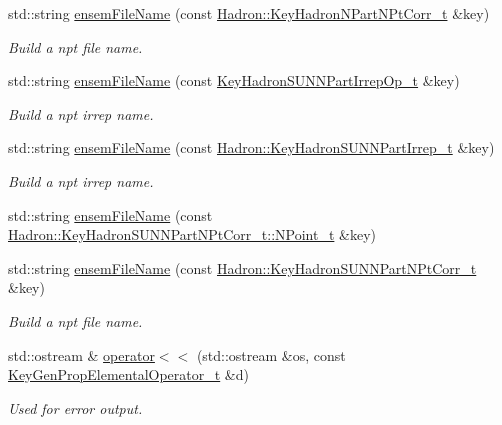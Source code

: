 \begin{DoxyCompactItemize}
std\+::string \mbox{\hyperlink{namespaceHadron_a8e1d2864f30c4b930840948366f8f356}{ensem\+File\+Name}} (const \mbox{\hyperlink{structHadron_1_1KeyHadronNPartNPtCorr__t}{Hadron\+::\+Key\+Hadron\+N\+Part\+N\+Pt\+Corr\+\_\+t}} \&key)
\begin{DoxyCompactList}\small\item\em Build a npt file name. \end{DoxyCompactList}\item 
std\+::string \mbox{\hyperlink{namespaceHadron_abd79d5d930df3781c0e12f1335c4b86e}{ensem\+File\+Name}} (const \mbox{\hyperlink{structHadron_1_1KeyHadronSUNNPartIrrepOp__t}{Key\+Hadron\+S\+U\+N\+N\+Part\+Irrep\+Op\+\_\+t}} \&key)
\begin{DoxyCompactList}\small\item\em Build a npt irrep name. \end{DoxyCompactList}\item 
std\+::string \mbox{\hyperlink{namespaceHadron_a45ea107463dbd2ccf4ceae63b851f861}{ensem\+File\+Name}} (const \mbox{\hyperlink{structHadron_1_1KeyHadronSUNNPartIrrep__t}{Hadron\+::\+Key\+Hadron\+S\+U\+N\+N\+Part\+Irrep\+\_\+t}} \&key)
\begin{DoxyCompactList}\small\item\em Build a npt irrep name. \end{DoxyCompactList}\item 
std\+::string \mbox{\hyperlink{namespaceHadron_aa7a6f1af8bf69b8a63890e92bfaaf738}{ensem\+File\+Name}} (const \mbox{\hyperlink{structHadron_1_1KeyHadronSUNNPartNPtCorr__t_1_1NPoint__t}{Hadron\+::\+Key\+Hadron\+S\+U\+N\+N\+Part\+N\+Pt\+Corr\+\_\+t\+::\+N\+Point\+\_\+t}} \&key)
\item 
std\+::string \mbox{\hyperlink{namespaceHadron_a535351e28134f75011451a8b7b5f7cb4}{ensem\+File\+Name}} (const \mbox{\hyperlink{structHadron_1_1KeyHadronSUNNPartNPtCorr__t}{Hadron\+::\+Key\+Hadron\+S\+U\+N\+N\+Part\+N\+Pt\+Corr\+\_\+t}} \&key)
\begin{DoxyCompactList}\small\item\em Build a npt file name. \end{DoxyCompactList}\item 
std\+::ostream \& \mbox{\hyperlink{namespaceHadron_a6bcf2658e0321428eeedf53a15a894aa}{operator$<$$<$}} (std\+::ostream \&os, const \mbox{\hyperlink{structHadron_1_1KeyGenPropElementalOperator__t}{Key\+Gen\+Prop\+Elemental\+Operator\+\_\+t}} \&d)
\begin{DoxyCompactList}\small\item\em Used for error output. \end{DoxyCompactList}\item 

\end{DoxyCompactItemize}
